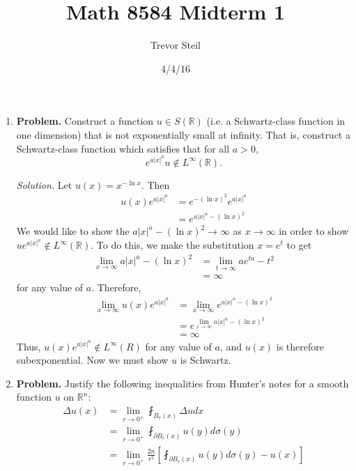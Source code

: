 \documentclass[a4paper]{article}
\title{Math 8584 Midterm 1 }
\date{4/4/16}
\author{Trevor Steil}
\newenvironment{solution}{\emph{Solution.}}{}
\newenvironment{problem}{\textbf{Problem.}}{}
\newcommand{\R}{\mathbb{R}}
\begin{document}
\maketitle

\begin{enumerate}
  \item
    \begin{problem}
      Construct a function $u \in S(\R)$ (i.e. a Schwartz-class function in one dimension) that is not exponentially small at infinity.
      That is, construct a Schwartz-class function which satisfies that for all $a > 0$,
      \[ e^{a |x|^a} u \not \in L^\infty(\R) .\]
    \end{problem}

    \begin{solution}
      Let $u(x) = x^{- \ln x}$. Then
      \begin{align*}
        u(x) e^{a |x|^a} &= e^{-(\ln x)^2} e^{a |x|^a} \\
        &= e^{a |x|^a - (\ln x)^2}
      \end{align*}
      We would like to show the $a |x|^a - (\ln x)^2 \to \infty$ as $x \to \infty$ in order to show $u e^{a |x|^a} \not\in L^\infty(\R)$.
      To do this, we make the substitution $x = e^t$ to get
      \begin{align*}
        \lim_{x \to \infty} a |x|^a - (\ln x)^2 &= \lim_{t \to \infty} a e^{ta} - t^2 \\
        &= \infty
      \end{align*}
      for any value of $a$. Therefore,
      \begin{align*}
        \lim_{x \to \infty} u(x) e^{a |x|^a} &= \lim_{x \to \infty} e^{a |x|^a - (\ln x)^2} \\
        &= e^{ \lim_{x \to \infty}  a|x|^a - (\ln x)^2} \\
        &= \infty
      \end{align*}
      Thus, $u(x) e^{a|x|^a} \not\in L^{\infty}(R)$ for any value of $a$, and $u(x)$ is therefore subexponential. Now we must show $u$ is Schwartz.
    \end{solution}

  \item
    \begin{problem}
      Justify the following inequalities from Hunter's notes for a smooth function $u$ on $\R^n$:
      \begin{align*}
        \Delta u(x) &= \lim_{r \to 0^+} \fint_{B_r(x)} \Delta u dx \\
        &= \lim_{r \to 0^+} \fint_{\partial B_r(x)}^{} u(y) d\sigma(y) \\
        &= \lim_{r \to 0^+} \frac{2n}{r^2} \left[ \fint_{\partial B_r(x)}^{} u(y) d\sigma(y) - u(x) \right]
      \end{align*}


\end{problem}
\end{enumerate}
\end{document}
